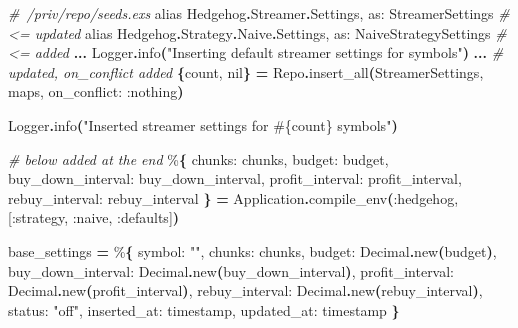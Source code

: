 \documentclass[
  oneside]{book}
\newenvironment{Shaded}{\begin{snugshade}}{\end{snugshade}}
\newcommand{\CommentTok}[1]{\textcolor[rgb]{0.56,0.35,0.01}{\textit{#1}}}
\newcommand{\ConstantTok}[1]{\textcolor[rgb]{0.56,0.35,0.01}{#1}}
\newcommand{\FunctionTok}[1]{\textcolor[rgb]{0.13,0.29,0.53}{\textbf{#1}}}
\newcommand{\ImportTok}[1]{#1}
\newcommand{\NormalTok}[1]{#1}
\newcommand{\OperatorTok}[1]{\textcolor[rgb]{0.81,0.36,0.00}{\textbf{#1}}}
\newcommand{\OtherTok}[1]{\textcolor[rgb]{0.56,0.35,0.01}{#1}}
\newcommand{\StringTok}[1]{\textcolor[rgb]{0.31,0.60,0.02}{#1}}
\newcommand{\VariableTok}[1]{\textcolor[rgb]{0.00,0.00,0.00}{#1}}
\begin{document}
\begin{Shaded}
\begin{Highlighting}[]
\CommentTok{\# /priv/repo/seeds.exs}
\ImportTok{alias} \ConstantTok{Hedgehog}\OperatorTok{.}\ConstantTok{Streamer}\OperatorTok{.}\ConstantTok{Settings}\NormalTok{, }\VariableTok{as:} \ConstantTok{StreamerSettings} \CommentTok{\# \textless{}= updated}
\ImportTok{alias} \ConstantTok{Hedgehog}\OperatorTok{.}\ConstantTok{Strategy}\OperatorTok{.}\ConstantTok{Naive}\OperatorTok{.}\ConstantTok{Settings}\NormalTok{, }\VariableTok{as:} \ConstantTok{NaiveStrategySettings} \CommentTok{\# \textless{}= added}
\OperatorTok{...}
\ConstantTok{Logger}\OperatorTok{.}\NormalTok{info}\FunctionTok{(}\StringTok{"Inserting default streamer settings for symbols"}\FunctionTok{)}
\OperatorTok{...}
\CommentTok{\# updated, \textasciigrave{}on\_conflict\textasciigrave{} added}
\FunctionTok{\{}\NormalTok{count, }\ConstantTok{nil}\FunctionTok{\}} \OperatorTok{=} \ConstantTok{Repo}\OperatorTok{.}\NormalTok{insert\_all}\FunctionTok{(}\ConstantTok{StreamerSettings}\NormalTok{, maps, }\VariableTok{on\_conflict:} \VariableTok{:nothing}\FunctionTok{)}

\ConstantTok{Logger}\OperatorTok{.}\NormalTok{info}\FunctionTok{(}\StringTok{"Inserted streamer settings for }\OtherTok{\#\{}\NormalTok{count}\OtherTok{\}}\StringTok{ symbols"}\FunctionTok{)}

\CommentTok{\# below added at the end}
\NormalTok{\%}\FunctionTok{\{}
  \VariableTok{chunks:}\NormalTok{ chunks,}
  \VariableTok{budget:}\NormalTok{ budget,}
  \VariableTok{buy\_down\_interval:}\NormalTok{ buy\_down\_interval,}
  \VariableTok{profit\_interval:}\NormalTok{ profit\_interval,}
  \VariableTok{rebuy\_interval:}\NormalTok{ rebuy\_interval}
\FunctionTok{\}} \OperatorTok{=} \ConstantTok{Application}\OperatorTok{.}\NormalTok{compile\_env}\FunctionTok{(}\VariableTok{:hedgehog}\NormalTok{, }\OtherTok{[}\VariableTok{:strategy}\NormalTok{, }\VariableTok{:naive}\NormalTok{, }\VariableTok{:defaults}\OtherTok{]}\FunctionTok{)}

\NormalTok{base\_settings }\OperatorTok{=}\NormalTok{ \%}\FunctionTok{\{}
  \VariableTok{symbol:} \StringTok{""}\NormalTok{,}
  \VariableTok{chunks:}\NormalTok{ chunks,}
  \VariableTok{budget:} \ConstantTok{Decimal}\OperatorTok{.}\NormalTok{new}\FunctionTok{(}\NormalTok{budget}\FunctionTok{)}\NormalTok{,}
  \VariableTok{buy\_down\_interval:} \ConstantTok{Decimal}\OperatorTok{.}\NormalTok{new}\FunctionTok{(}\NormalTok{buy\_down\_interval}\FunctionTok{)}\NormalTok{,}
  \VariableTok{profit\_interval:} \ConstantTok{Decimal}\OperatorTok{.}\NormalTok{new}\FunctionTok{(}\NormalTok{profit\_interval}\FunctionTok{)}\NormalTok{,}
  \VariableTok{rebuy\_interval:} \ConstantTok{Decimal}\OperatorTok{.}\NormalTok{new}\FunctionTok{(}\NormalTok{rebuy\_interval}\FunctionTok{)}\NormalTok{,}
  \VariableTok{status:} \StringTok{"off"}\NormalTok{,}
  \VariableTok{inserted\_at:}\NormalTok{ timestamp,}
  \VariableTok{updated\_at:}\NormalTok{ timestamp}
\FunctionTok{\}}


\end{Highlighting}
\end{Shaded}
\end{document}
